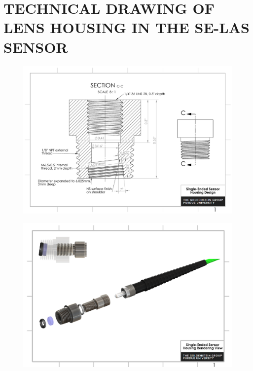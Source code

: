 \chapter{TECHNICAL DRAWING OF LENS HOUSING IN THE SE-LAS SENSOR}
\begin{figure}
    \centering
        \includegraphics[angle=90,width=1\textwidth]{fig/final1.pdf}      
\end{figure}

\begin{figure}
    \centering
        \includegraphics[angle=90,width=1\textwidth]{fig/appendix_v2.png}      
\end{figure}